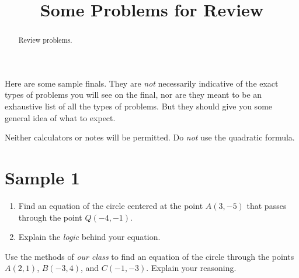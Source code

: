 \documentclass{ximera}
\title{Some Problems for Review}
\begin{document}
\begin{abstract}
Review problems.
\end{abstract}
\maketitle

Here are some sample finals. They are \emph{not} necessarily indicative of the exact types of problems you will see on the final, nor are they meant to be an exhaustive list of all the types of problems. But they should give you some general idea of what to expect.

Neither calculators or notes will be permitted. Do \emph{not} use the quadratic formula.

\section{Sample 1}

\begin{question}  \label{Q34gt4r5t4t44}
\begin{enumerate}
\item Find an equation of the circle centered at the point $A(3,-5)$ that passes through the point $Q(-4,-1)$.

\item Explain the \emph{logic} behind your equation.
\end{enumerate}

\end{question}


\begin{question}  \label{Qdftr4tytuiiii}
Use the methods of \emph{our class} to find an equation of the circle through the points $A(2,1)$, $B(-3,4)$, and $C(-1,-3)$. Explain your reasoning. 

\end{question}
\end{document}
